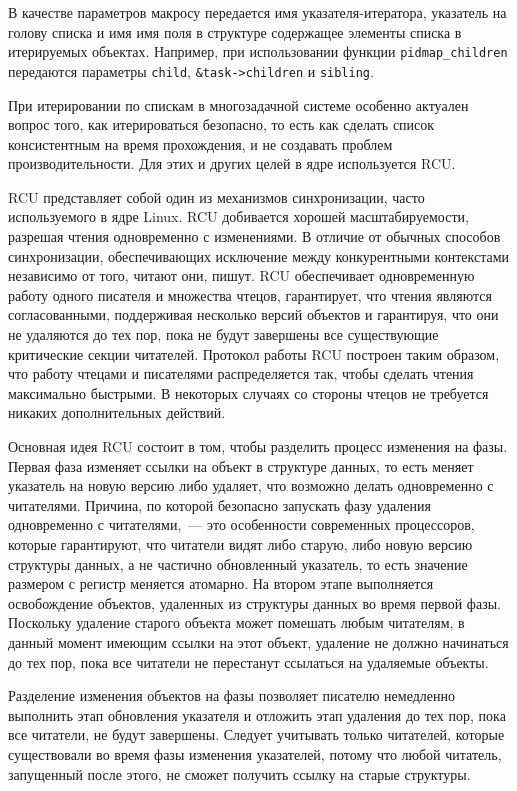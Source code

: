 В качестве параметров макросу передается имя указателя-итератора, указатель на
голову списка и имя имя поля в структуре содержащее элементы списка в
итерируемых объектах. Например, при использовании функции
\texttt{pidmap\_children} передаются параметры \texttt{child},
\texttt{\&task->children} и \texttt{sibling}.

При итерировании по спискам в многозадачной системе особенно актуален вопрос
того, как итерироваться безопасно, то есть как сделать список консистентным на
время прохождения, и не создавать проблем производительности. Для этих и других
целей в ядре используется RCU.

RCU представляет собой один из механизмов синхронизации, часто используемого в
ядре Linux. RCU добивается хорошей масштабируемости, разрешая чтения
одновременно
с изменениями. В отличие от обычных способов синхронизации, обеспечивающих
исключение между конкурентными контекстами независимо от того, читают они,
пишут. RCU обеспечивает одновременную работу одного писателя и множества чтецов,
гарантирует, что чтения являются согласованными, поддерживая несколько версий
объектов и гарантируя, что они не удаляются до тех пор, пока не будут завершены
все существующие критические секции читателей. Протокол работы RCU построен
таким образом, что работу чтецами и писателями распределяется так, чтобы сделать
чтения максимально быстрыми. В некоторых случаях со стороны чтецов не требуется
никаких дополнительных действий.

Основная идея RCU состоит в том, чтобы разделить процесс изменения на фазы.
Первая фаза изменяет ссылки на объект в структуре данных, то есть меняет
указатель на новую версию либо удаляет, что возможно делать одновременно с
читателями. Причина, по которой безопасно запускать фазу удаления одновременно с
читателями,~--- это особенности современных процессоров, которые гарантируют,
что читатели видят либо старую, либо новую версию структуры данных, а не
частично обновленный указатель, то есть значение размером с регистр меняется
атомарно. На втором этапе выполняется освобождение объектов, удаленных из
структуры данных во время первой фазы. Поскольку удаление старого объекта может
помешать любым читателям, в данный момент имеющим ссылки на этот объект,
удаление не должно начинаться до тех пор, пока все читатели не перестанут
ссылаться на удаляемые объекты.

Разделение изменения объектов на фазы позволяет писателю немедленно выполнить
этап обновления указателя и отложить этап удаления до тех пор, пока все
читатели, не будут завершены. Следует учитывать только читателей, которые
существовали во время фазы изменения указателей, потому что любой читатель,
запущенный после этого, не сможет получить ссылку на старые структуры.


